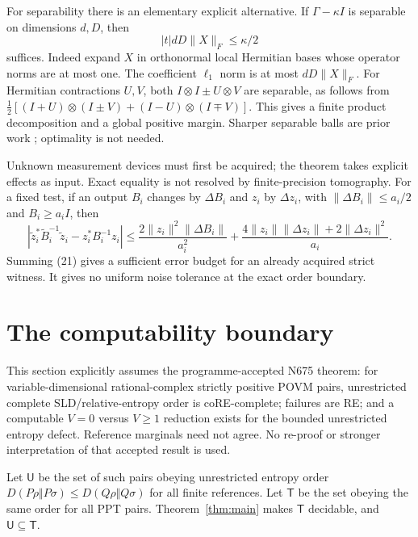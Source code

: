 \documentclass[11pt]{article}
\begin{document}
For separability there is an elementary explicit alternative. If
$\Gamma-\kappa I$ is separable on dimensions $d,D$, then
\[
                   |t|dD\|X\|_F\leq\kappa/2                 \tag{20}
\]
suffices. Indeed expand $X$ in orthonormal local Hermitian bases whose
operator norms are at most one. The coefficient $\ell_1$ norm is at most
$dD\|X\|_F$. For Hermitian contractions $U,V$, both
$I\otimes I\pm U\otimes V$ are separable, as follows from
$\tfrac12[(I+U)\otimes(I\pm V)+(I-U)\otimes(I\mp V)]$.
This gives a finite product decomposition and a global positive margin.
Sharper separable balls are prior work \cite{gurvits}; optimality is not needed.

Unknown measurement devices must first be acquired; the theorem takes explicit
effects as input. Exact equality is not resolved by finite-precision tomography.
For a fixed test, if an output $B_i$ changes by $\Delta B_i$ and $z_i$ by
$\Delta z_i$, with $\|\Delta B_i\|\leq a_i/2$ and $B_i\geq a_iI$, then
\[
 |\widetilde z_i^*\widetilde B_i^{-1}\widetilde z_i-z_i^*B_i^{-1}z_i|
 \leq \frac{2\|z_i\|^2\|\Delta B_i\|}{a_i^2}
       +\frac{4\|z_i\|\|\Delta z_i\|+2\|\Delta z_i\|^2}{a_i}.\tag{21}
\]
Summing (21) gives a sufficient error budget for an already acquired strict
witness. It gives no uniform noise tolerance at the exact order boundary.

\section{The computability boundary}\label{sec:boundary}
This section explicitly assumes the programme-accepted N675 theorem:
for variable-dimensional rational-complex strictly positive POVM pairs,
unrestricted complete SLD/relative-entropy order is coRE-complete; failures
are RE; and a computable $V=0$ versus $V\geq1$ reduction exists for the
bounded unrestricted entropy defect. Reference marginals need not agree.
No re-proof or stronger interpretation of that accepted result is used.

Let $\mathsf U$ be the set of such pairs obeying unrestricted entropy order
$D(P\rho\Vert P\sigma)\leq D(Q\rho\Vert Q\sigma)$ for all finite references.
Let $\mathsf T$ be the set obeying the same order for all PPT pairs.
Theorem~\ref{thm:main} makes $\mathsf T$ decidable, and
$\mathsf U\subseteq\mathsf T$.
\end{document}
